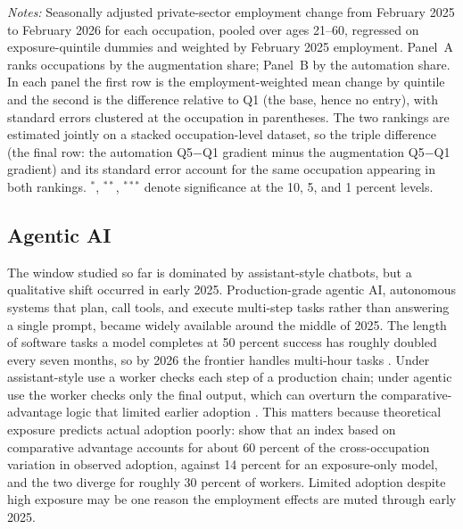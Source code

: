 \documentclass[12pt]{article}
\begin{document}
\begin{table}[tp]
  \centering
  \caption{Employment change by Handa augmentation and automation quintile, February 2025 to February 2026, all ages 21--60, private sector, seasonally adjusted.}
  \label{tab:aug_auto}
  
  \begin{minipage}{\textwidth}\footnotesize\textit{Notes:} Seasonally adjusted private-sector employment change from February 2025 to February 2026 for each occupation, pooled over ages 21--60, regressed on exposure-quintile dummies and weighted by February 2025 employment. Panel~A ranks occupations by the \citet{handa2025} augmentation share; Panel~B by the automation share. In each panel the first row is the employment-weighted mean change by quintile and the second is the difference relative to Q1 (the base, hence no entry), with standard errors clustered at the occupation in parentheses. The two rankings are estimated jointly on a stacked occupation-level dataset, so the triple difference (the final row: the automation Q5$-$Q1 gradient minus the augmentation Q5$-$Q1 gradient) and its standard error account for the same occupation appearing in both rankings. $^{*}$, $^{**}$, $^{***}$ denote significance at the 10, 5, and 1 percent levels.\end{minipage}
\end{table}

\subsection{Agentic AI}\label{sec:regression:agentic}

The window studied so far is dominated by assistant-style chatbots, but a qualitative shift occurred in early 2025. Production-grade agentic AI, autonomous systems that plan, call tools, and execute multi-step tasks rather than answering a single prompt, became widely available around the middle of 2025. The length of software tasks a model completes at 50 percent success has roughly doubled every seven months, so by 2026 the frontier handles multi-hour tasks \citep{metr2025}. Under assistant-style use a worker checks each step of a production chain; under agentic use the worker checks only the final output, which can overturn the comparative-advantage logic that limited earlier adoption \citep{demirer2026}. This matters because theoretical exposure predicts actual adoption poorly: \citet{lindenlaub2026} show that an index based on comparative advantage accounts for about 60 percent of the cross-occupation variation in observed adoption, against 14 percent for an exposure-only model, and the two diverge for roughly 30 percent of workers. Limited adoption despite high exposure may be one reason the employment effects are muted through early 2025.
\end{document}
